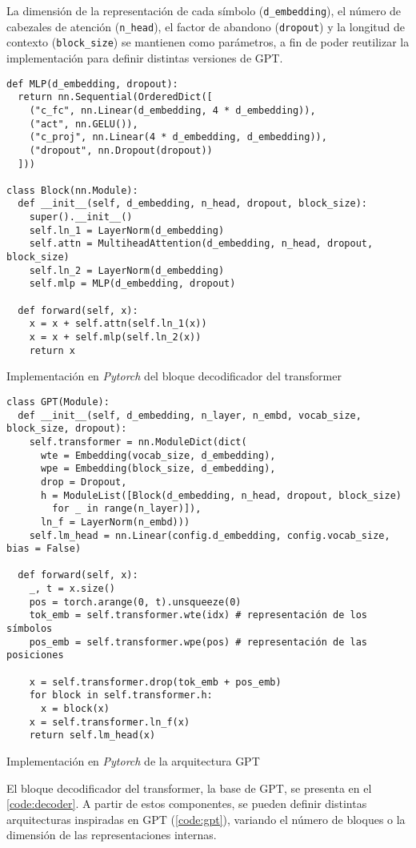 La dimensión de la representación de cada símbolo (\texttt{d\_embedding}), el número de cabezales de atención (\texttt{n\_head}), el factor de abandono (\texttt{dropout}) y la longitud de contexto (\texttt{block\_size}) se mantienen como parámetros, a fin de poder reutilizar la implementación para definir distintas versiones de GPT. 

\begin{code}
\begin{verbatim}
def MLP(d_embedding, dropout):
  return nn.Sequential(OrderedDict([
    ("c_fc", nn.Linear(d_embedding, 4 * d_embedding)),
    ("act", nn.GELU()),
    ("c_proj", nn.Linear(4 * d_embedding, d_embedding)),
    ("dropout", nn.Dropout(dropout))
  ]))

class Block(nn.Module):
  def __init__(self, d_embedding, n_head, dropout, block_size):
    super().__init__()
    self.ln_1 = LayerNorm(d_embedding)
    self.attn = MultiheadAttention(d_embedding, n_head, dropout, block_size)
    self.ln_2 = LayerNorm(d_embedding)
    self.mlp = MLP(d_embedding, dropout)

  def forward(self, x):
    x = x + self.attn(self.ln_1(x))
    x = x + self.mlp(self.ln_2(x))
    return x
\end{verbatim}
\caption{Implementación en \textit{Pytorch} del bloque decodificador del transformer}
\label{code:decoder}
\end{code}

\begin{code}
\begin{verbatim}
class GPT(Module):
  def __init__(self, d_embedding, n_layer, n_embd, vocab_size, block_size, dropout):
    self.transformer = nn.ModuleDict(dict(
      wte = Embedding(vocab_size, d_embedding),
      wpe = Embedding(block_size, d_embedding),
      drop = Dropout,
      h = ModuleList([Block(d_embedding, n_head, dropout, block_size) 
        for _ in range(n_layer)]),
      ln_f = LayerNorm(n_embd)))
    self.lm_head = nn.Linear(config.d_embedding, config.vocab_size, bias = False)

  def forward(self, x):
    _, t = x.size()
    pos = torch.arange(0, t).unsqueeze(0)
    tok_emb = self.transformer.wte(idx) # representación de los símbolos
    pos_emb = self.transformer.wpe(pos) # representación de las posiciones

    x = self.transformer.drop(tok_emb + pos_emb)
    for block in self.transformer.h:
      x = block(x)
    x = self.transformer.ln_f(x)
    return self.lm_head(x)
\end{verbatim}
\caption{Implementación en \textit{Pytorch} de la arquitectura GPT}
\label{code:gpt}
\end{code}

El bloque decodificador del transformer, la base de GPT, se presenta en el \cref{code:decoder}. A partir de estos componentes, se pueden definir distintas arquitecturas inspiradas en GPT (\cref{code:gpt}), variando el número de bloques o la dimensión de las representaciones internas.
